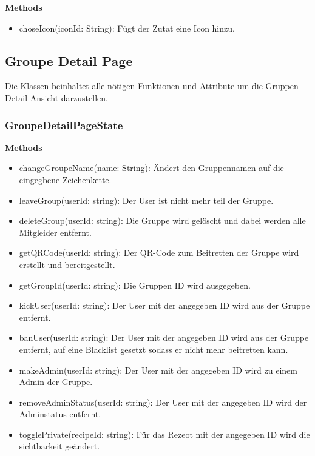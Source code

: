 \documentclass[parskip=full]{scrartcl}
\begin{document}
                \textbf{Methods}
                    \begin{itemize}
                        \item choseIcon(iconId: String): Fügt der Zutat eine Icon hinzu. 
                    \end{itemize}

        \newpage
        
         \subsection{Groupe Detail Page}
            Die Klassen beinhaltet alle nötigen Funktionen und Attribute um die Gruppen-Detail-Ansicht darzustellen.\newline
            
        \subsubsection{GroupeDetailPageState}
            \textbf{Methods}
            \begin{itemize}
                \item changeGroupeName(name: String): Ändert den Gruppennamen auf die eingegbene Zeichenkette.
                \item leaveGroup(userId: string): Der User ist nicht mehr teil der Gruppe.
                \item deleteGroup(userId: string): Die Gruppe wird gelöscht und dabei werden alle Mitgleider entfernt.
                \item getQRCode(userId: string): Der QR-Code zum Beitretten der Gruppe wird erstellt und bereitgestellt.
                \item getGroupId(userId: string): Die Gruppen ID wird ausgegeben.
                \item kickUser(userId: string): Der User mit der angegeben ID wird aus der Gruppe entfernt.
                \item banUser(userId: string): Der User mit der angegeben ID wird aus der Gruppe entfernt, auf eine Blacklist gesetzt sodass er nicht mehr beitretten kann.
                \item makeAdmin(userId: string): Der User mit der angegeben ID wird zu einem Admin der Gruppe.
                \item removeAdminStatus(userId: string): Der User mit der angegeben ID wird der Adminstatus entfernt.
                \item togglePrivate(recipeId: string): Für das Rezeot mit der angegeben ID wird die \gls{sichtbarkeit} geändert.
            \end{itemize}
\end{document}
